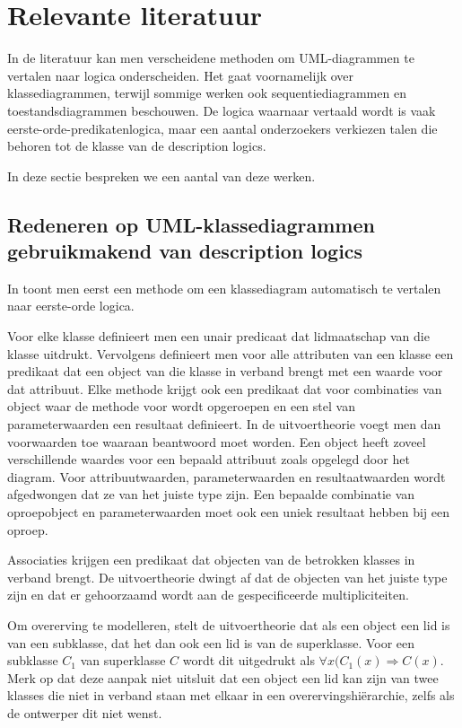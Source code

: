 \chapter{Relevante literatuur}
In de literatuur kan men verscheidene methoden om UML-diagrammen te vertalen naar logica onderscheiden. Het gaat voornamelijk over klassediagrammen, terwijl sommige werken ook sequentiediagrammen en toestandsdiagrammen beschouwen. De logica waarnaar vertaald wordt is vaak eerste-orde-predikatenlogica, maar een aantal onderzoekers verkiezen talen die behoren tot de klasse van de description logics.

In deze sectie bespreken we een aantal van deze werken.

\section{Redeneren op UML-klassediagrammen gebruikmakend van description logics}
In \cite{BerardiDaniela2005RoUc} toont men eerst een methode om een klassediagram automatisch te vertalen naar eerste-orde logica.

Voor elke klasse definieert men een unair predicaat dat lidmaatschap van die klasse uitdrukt. Vervolgens definieert men voor alle attributen van een klasse een predikaat dat een object van die klasse in verband brengt met een waarde voor dat attribuut. Elke methode krijgt ook een predikaat dat voor combinaties van object waar de methode voor wordt opgeroepen en een stel van parameterwaarden een resultaat definieert. In de uitvoertheorie voegt men dan voorwaarden toe waaraan beantwoord moet worden. Een object heeft zoveel verschillende waardes voor een bepaald attribuut zoals opgelegd door het diagram. Voor attribuutwaarden, parameterwaarden en resultaatwaarden wordt afgedwongen dat ze van het juiste type zijn. Een bepaalde combinatie van oproepobject en parameterwaarden moet ook een uniek resultaat hebben bij een oproep.

Associaties krijgen een predikaat dat objecten van de betrokken klasses in verband brengt. De uitvoertheorie dwingt af dat de objecten van het juiste type zijn en dat er gehoorzaamd wordt aan de gespecificeerde multipliciteiten.

Om overerving te modelleren, stelt de uitvoertheorie dat als een object een lid is van een subklasse, dat het dan ook een lid is van de superklasse. Voor een subklasse $C_1$ van superklasse $C$ wordt dit uitgedrukt als $\forall{x}(C_1(x) \Rightarrow C(x)$. Merk op dat deze aanpak niet uitsluit dat een object een lid kan zijn van twee klasses die niet in verband staan met elkaar in een overervingshi\"erarchie, zelfs als de ontwerper dit niet wenst.

